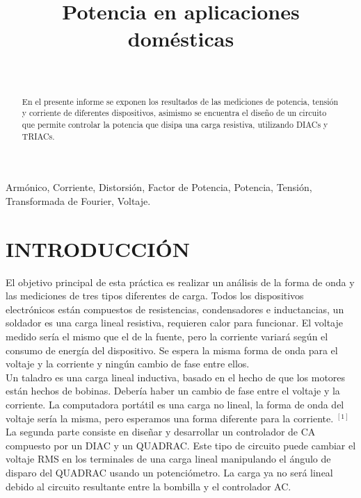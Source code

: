\documentclass[journal]{IEEEtran}
\title{\textbf{Potencia en aplicaciones domésticas}}
\author{
  \IEEEauthorblockN{ Jorge Lambra\~no$^3$, Julian Rojas$^2$, 
  Juan Sánchez$^3$}\\
  \IEEEauthorblockA{\texttt{\small{$^1$jelambrano, $^2$drojasj, $^3$paradac @uninorte.edu.co
   }}}}
\begin{document}
\maketitle

\begin{abstract}  
En el presente informe se exponen los resultados de las
mediciones de potencia, tensión y corriente de diferentes
dispositivos, asimismo se encuentra el diseño de un 
circuito que permite controlar la potencia que disipa una 
carga resistiva, utilizando DIACs y TRIACs. 
\end{abstract}


\begin{IEEEkeywords}  
Armónico, Corriente, Distorsión, Factor de Potencia,  Potencia, Tensión, Transformada de Fourier, Voltaje. 
\end{IEEEkeywords}

\section{INTRODUCCIÓN}

El objetivo principal de esta práctica es realizar 
un análisis de la forma de onda y las mediciones 
de tres tipos diferentes de carga.
Todos los dispositivos electrónicos están compuestos 
de resistencias, condensadores e inductancias, un 
soldador es una carga lineal resistiva, requieren calor 
para funcionar. El voltaje medido sería el mismo que 
el de la fuente, pero la corriente variará según el 
consumo de energía del dispositivo. Se espera la misma 
forma de onda para el voltaje y la corriente y ningún 
cambio de fase entre ellos.\\

Un taladro es una carga lineal inductiva, basado 
en el hecho de que los motores están hechos de 
bobinas. Debería haber un cambio de fase entre el 
voltaje y la corriente. La computadora portátil 
es una carga no lineal, la forma de onda del voltaje 
sería la misma, pero esperamos una forma diferente 
para la corriente. $^{\left[1\right]}$ \\

La segunda parte consiste en diseñar y desarrollar 
un controlador de CA compuesto por un DIAC y un 
QUADRAC. Este tipo de circuito puede cambiar el 
voltaje RMS en los terminales de una carga lineal 
manipulando el ángulo de disparo del QUADRAC usando 
un potenciómetro. La carga ya no será lineal debido 
al circuito resultante entre la bombilla y el 
controlador AC.
\end{document}
